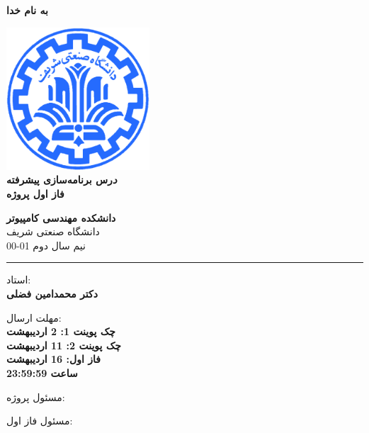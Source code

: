 \documentclass[]{article}
\begin{document}
\begin{titlepage}
\begin{center}

\textbf{ \Huge{به نام خدا} }
        
\vspace{0.2cm}

\includegraphics[width=0.4\textwidth]{sharif1.png}\\
\vspace{0.2cm}
\textbf{ \Huge{\emph درس برنامه‌سازی پیشرفته} }\\
\vspace{0.25cm}
\textbf{ \Large{ فاز اول پروژه} }
\vspace{0.2cm}
       
 
      \large \textbf{دانشکده مهندسی کامپیوتر}\\\vspace{0.1cm}
    \large   دانشگاه صنعتی شریف\\\vspace{0.2cm}
       \large   ﻧﯿﻢ سال دوم 01-00 \\\vspace{0.10cm}
      \noindent\rule[1ex]{\linewidth}{1pt}
استاد:\\
    \textbf{{دکتر محمدامین فضلی}}



    \vspace{0.20cm}

   مهلت ارسال:\\
    \textbf{{چک پوینت 1: 2 اردیبهشت}}\\
    \textbf{{چک پوینت 2: 11 اردیبهشت}}\\
    \textbf{{فاز اول: 16 اردیبهشت}}\\
    \textbf{{ساعت 23:59:59}}

    \vspace{0.10cm}
مسئول پروژه:\\
    \textbf{}
    
        \vspace{0.10cm}
مسئول فاز اول:\\
    \textbf{}
    

\end{center}
\end{titlepage}
\end{document}
